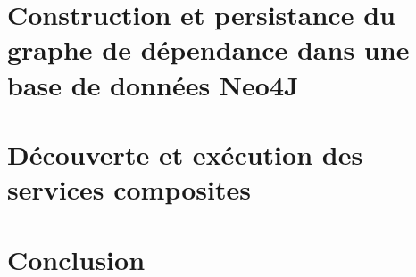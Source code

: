 \section{Construction et persistance du graphe de dépendance dans une
  base de données Neo4J}
\section{Découverte et exécution des services composites}

\section*{Conclusion}
\label{sec:conclusion}
 


